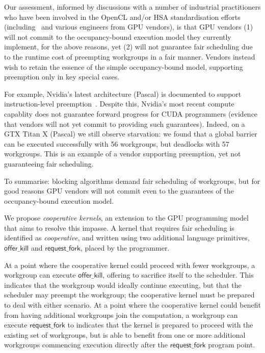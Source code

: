 \documentclass[parskip=half,sigconf,review, anonymous=true, acmcopyrightmode=none]{acmart}
\newcommand{\offerfork}{\mathsf{request\_fork}}
\newcommand{\offerkill}{\mathsf{offer\_kill}}
\begin{document}
Our assessment, informed by discussions with a number of industrial
practitioners who have been involved in the OpenCL and/or HSA
standardisation efforts
(including~\cite{PersonalCommunicationRichards,PersonalCommunicationHowes}
and various engineers from GPU vendors), is that GPU vendors (1) will
not commit to the occupancy-bound execution model they currently
implement, for the above reasons, yet (2) will not guarantee fair
scheduling due to the runtime cost of preempting workgroups in a fair
manner.  Vendors instead wish to retain the essence of the simple
occupancy-bound model, supporting preemption only in key special
cases.

For example, Nvidia's latest architecture (Pascal) is documented to
support instruction-level preemption~\cite{??}. Despite this, Nvidia's
most recent compute capablity does not guarantee forward progress for
CUDA programmers (evidence that vendors will not yet commit to providing such guarantees).
Indeed, on a GTX Titan X (Pascal) we still observe starvation:
we found that a global barrier can be executed successfully with 56 workgroups, but
deadlocks with 57 workgroups.  This is an example of a vendor
supporting preemption, yet not guaranteeing fair scheduling.

%
To summarise: blocking algorithms
demand fair scheduling of workgroups, but for good reasons
GPU vendors will not commit even to the guarantees of the
occupancy-bound execution model.

We propose \emph{cooperative kernels}, an extension to the GPU
programming model that aims to resolve this impasse.  A kernel
that requires fair scheduling is identified as \emph{cooperative}, and written using two additional
language primitives, $\offerkill$ and $\offerfork$, placed by the programmer.

At a point where the cooperative kernel could proceed with fewer
workgroups, a workgroup can execute $\offerkill$, offering to
sacrifice itself to the scheduler.  This indicates that the workgroup
would ideally continue executing, but that the
scheduler may preempt the workgroup; the cooperative kernel
must be prepared to deal with either scenario.
%
At a point where the cooperative kernel could benefit from having
additional workgroups join the computation, a workgroup can execute
$\offerfork$ to indicates that the
kernel is prepared to proceed with the existing set of workgroups, but
is able to benefit from one or more additional workgroups
commencing execution directly after the $\offerfork$ program point.
\end{document}
